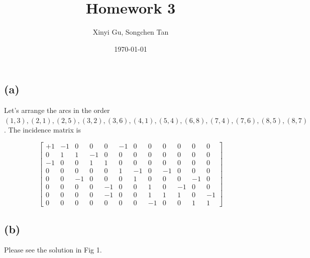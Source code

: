 \documentclass{article}
\title{Homework 3}
\author{Xinyi Gu, Songchen Tan}
\date{\today}
\newcommand{\1}{\bm 1}
\begin{document}
\maketitle
\section{}

\subsection*{(a)}
Let's arrange the arcs in the order $(1, 3), (2, 1), (2, 5), (3, 2), (3, 6), (4, 1), (5, 4), (6, 8), (7, 4), (7, 6), (8, 5), (8, 7)$. The incidence matrix is

$$
\begin{bmatrix}
+1&-1&0&0&0&-1&0&0&0&0&0&0\\
0&1&1&-1& 0&0&0&0& 0&0&0&0\\
-1&0&0&1& 1&0&0&0& 0&0&0&0\\
0&0&0&0& 0&1&-1&0& -1&0&0&0\\
0&0&-1&0& 0&0&1&0& 0&0&-1&0\\
0&0&0&0& -1&0&0&1& 0&-1&0&0\\
0&0&0&0& -1&0&0&1& 1&1&0&-1\\
0&0&0&0& 0&0&0&-1& 0&0&1&1
\end{bmatrix}
$$

\subsection*{(b)}

Please see the solution in Fig 1.
\end{document}
